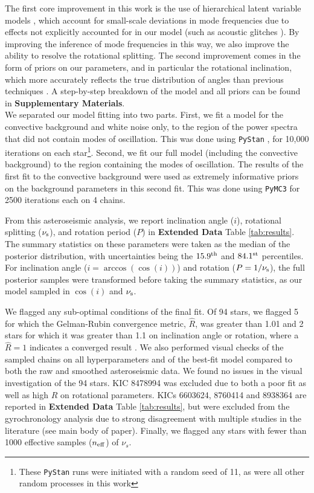 The first core improvement in this work is the use of hierarchical latent variable models \cite{m_hogg+2010, m_hall+2019}, which account for small-scale deviations in mode frequencies due to effects not explicitly accounted for in our model (such as acoustic glitches \cite{m_mazumdar+2014}). By improving the inference of mode frequencies in this way, we also improve the ability to resolve the rotational splitting. The second improvement comes in the form of priors on our parameters, and in particular the rotational inclination, which more accurately reflects the true distribution of angles than previous techniques \cite{m_chaplin+basu2017}. A step-by-step breakdown of the model and all priors can be found in \textbf{Supplementary Materials}.\\

We separated our model fitting into two parts. First, we fit a model for the convective background and white noise only, to the region of the power spectra that did not contain modes of oscillation. This was done using \texttt{PyStan} \cite{m_vanhoey+2013, m_carpenter+2017}, for 10,000 iterations on each star\footnote{These \texttt{PyStan} runs were initiated with a random seed of 11, as were all other random processes in this work}. Second, we fit our full model (including the convective background) to the region containing the modes of oscillation. The results of the first fit to the convective background were used as extremely informative priors on the background parameters in this second fit. This was done using \texttt{PyMC3} \cite{m_vanderwalt+2011,m_salvatier+2016, m_thetheanodevelopmentteam+2016} for 2500 iterations each on 4 chains.

From this asteroseismic analysis, we report inclination angle ($i$), rotational splitting ($\nu_{\rm s}$), and rotation period ($P$) in \textbf{Extended Data} Table \ref{tab:results}. The summary statistics on these parameters were taken as the median of the posterior distribution, with uncertainties being the $15.9^{\rm th}$ and $84.1^{\rm st}$ percentiles. For inclination angle ($i = \arccos(\cos(i))$) and rotation ($P = 1/\nu_{\rm s}$), the full posterior samples were transformed before taking the summary statistics, as our model sampled in $\cos(i)$ and $\nu_{\rm s}$.

We flagged any sub-optimal conditions of the final fit. Of 94 stars, we flagged 5 for which the Gelman-Rubin convergence metric, $\hat{R}$, was greater than 1.01 and 2 stars for which it was greater than 1.1 on inclination angle or rotation, where a $\hat{R} = 1$ indicates a converged result \cite{m_gelman+rubin1992}. We also performed visual checks of the sampled chains on all hyperparameters and of the best-fit model compared to both the raw and smoothed asteroseismic data. We found no issues in the visual investigation of the 94 stars. KIC 8478994 was excluded due to both a poor fit as well as high $\hat{R}$ on rotational parameters. KICs 6603624, 8760414 and 8938364 are reported in \textbf{Extended Data} Table \ref{tab:results}, but were excluded from the gyrochronology analysis due to strong disagreement with multiple studies in the literature (see main body of paper). Finally, we flagged any stars with fewer than 1000 effective samples ($n_{\rm eff}$) of $\nu_s$.


